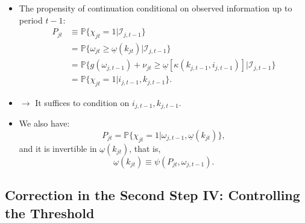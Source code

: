 \documentclass[
]{book}
\providecommand{\tightlist}{%
  \setlength{\itemsep}{0pt}\setlength{\parskip}{0pt}}
\begin{document}
\begin{itemize}
\tightlist
\item
  The propensity of continuation conditional on observed information up to period \(t - 1\):
  \begin{equation}
  \begin{split}
  P_{jt} &\equiv \mathbb{P}\{\chi_{jt} = 1|\mathcal{I}_{j, t - 1}\}\\
  &= \mathbb{P}\{\omega_{jt} \ge \underline{\omega}(k_{jt}) |\mathcal{I}_{j, t - 1}\}\\
  &= \mathbb{P}\{g(\omega_{j, t - 1}) + \nu_{jt} \ge \underline{\omega}[\kappa(k_{j, t - 1}, i_{j, t - 1})]|\mathcal{I}_{j, t - 1} \}\\
  &= \mathbb{P}\{ \chi_{jt} = 1| i_{j, t - 1}, k_{j, t - 1}\}.
  \end{split}
  \end{equation}
\item
  \(\rightarrow\) It suffices to condition on \(i_{j, t - 1}, k_{j, t - 1}\).
\item
  We also have:
  \begin{equation}
  P_{jt} = \mathbb{P}\{\chi_{jt} = 1| \omega_{j, t - 1}, \underline{\omega}(k_{jt})\},
  \end{equation}
  and it is invertible in \(\underline{\omega}(k_{jt})\), that is,
  \begin{equation}
  \underline{\omega}(k_{jt}) \equiv \psi(P_{jt}, \omega_{j, t - 1}).
  \end{equation}
\end{itemize}

\hypertarget{correction-in-the-second-step-iv-controlling-the-threshold}{%
\subsection{Correction in the Second Step IV: Controlling the Threshold}\label{correction-in-the-second-step-iv-controlling-the-threshold}}
\end{document}

